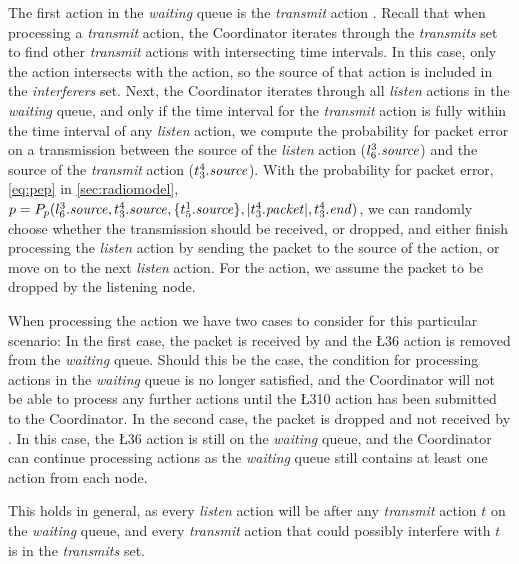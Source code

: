 The first action in the \textit{waiting} queue is the \textit{transmit} action . Recall that when
processing a \textit{transmit} action, the Coordinator iterates through the \textit{transmits} set to find
other \textit{transmit} actions with intersecting time intervals. In this case, only the  action
intersects with the  action, so the source of that action is included in the \textit{interferers} set.
Next, the Coordinator iterates through all \textit{listen} actions in the \textit{waiting} queue, and only if
the time interval for the \textit{transmit} action is fully within the time interval of any \textit{listen}
action, we compute the probability for packet error on a transmission between the source of the
\textit{listen} action ($l^{3}_{6}.\mathit{source}$) and the source of the \textit{transmit} action
($t^{4}_{3}.\mathit{source}$). With the probability for packet error, \autoref{eq:pep} in
\autoref{sec:radiomodel}, $p = P_p(l^{3}_{6}.\mathit{source}, t^{4}_{3}.\mathit{source}, \{
    t^{1}_{5}.\mathit{source} \}, |t^{4}_{3}.\mathit{packet}|, t^{4}_{3}.\mathit{end})$, we can randomly choose
whether the transmission should be received, or dropped, and either finish processing the \textit{listen}
action by sending the packet to the source of the action, or move on to the next \textit{listen} action. For
the  action, we assume the packet to be dropped by the listening node. \medbreak

When processing the  action we have two cases to consider for this particular scenario: In the first
case, the packet is received by  and the \L{3}{6} action is removed from the \textit{waiting} queue.
Should this be the case, the condition for processing actions in the \textit{waiting} queue is no longer
satisfied, and the Coordinator will not be able to process any further actions until the \L{3}{10} action has
been submitted to the Coordinator. In the second case, the packet is dropped and not received by . In
this case, the \L{3}{6} action is still on the \textit{waiting} queue, and the Coordinator can continue
processing actions as the \textit{waiting} queue still contains at least one action from each node.
\medbreak

This holds in general, as every \textit{listen} action will be after any \textit{transmit} action $t$ on the
\textit{waiting} queue, and every \textit{transmit} action that could possibly interfere with $t$ is in the
\textit{transmits} set.


